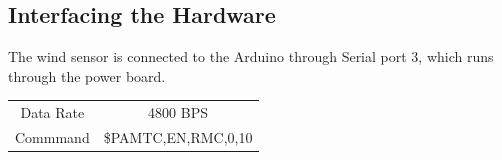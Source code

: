 \documentclass[letterpaper]{article}
\begin{document}

\subsection{Interfacing the Hardware} %
\label{sub:Interfacing the Hardware}

The wind sensor is connected to the Arduino through Serial port 3, which runs through the power board.

\begin{tabular}{c|c}
	\hline
	Data Rate 	& 	4800 BPS 	\\
	Commmand 	& 	\$PAMTC,EN,RMC,0,10 \\
\end{tabular}


\end{document}
